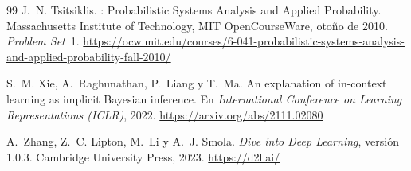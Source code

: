 \begin{thebibliography}{99}
J.~N. Tsitsiklis.
: Probabilistic Systems Analysis and Applied Probability.
\newblock Massachusetts Institute of Technology, MIT OpenCourseWare, otoño de 2010. \emph{Problem Set}~1.
\newblock \url{https://ocw.mit.edu/courses/6-041-probabilistic-systems-analysis-and-applied-probability-fall-2010/}

S.~M. Xie, A.~Raghunathan, P.~Liang y T.~Ma.
\newblock An explanation of in-context learning as implicit Bayesian inference.
\newblock En \emph{International Conference on Learning Representations (ICLR)}, 2022.
\newblock \url{https://arxiv.org/abs/2111.02080}

A.~Zhang, Z.~C. Lipton, M.~Li y A.~J. Smola.
\newblock \emph{Dive into Deep Learning}, versión 1.0.3.
\newblock Cambridge University Press, 2023.
\newblock \url{https://d2l.ai/}

\end{thebibliography}
